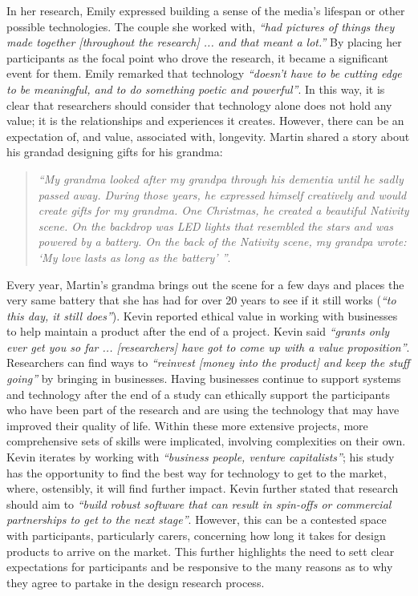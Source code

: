 In her research, Emily expressed building a sense of the media’s lifespan or other possible technologies. The couple she worked with, \textit{``had pictures of things they made together [throughout the research] ... and that meant a lot.''} By placing her participants as the focal point who drove the research, it became a significant event for them. Emily remarked that technology \textit{``doesn’t have to be cutting edge to be meaningful, and to do something poetic and powerful''}. In this way, it is clear that researchers should consider that technology alone does not hold any value; it is the relationships and experiences it creates. However, there can be an expectation of, and value, associated with, longevity. Martin shared a story about his grandad designing gifts for his grandma:
\begin{quote}
\textit{``My grandma looked after my grandpa through his dementia until he sadly passed away. During those years, he expressed himself creatively and would create gifts for my grandma. One Christmas, he created a beautiful Nativity scene. On the backdrop was LED lights that resembled the stars and was powered by a battery. On the back of the Nativity scene, my grandpa wrote: `My love lasts as long as the battery' ''}.
\end{quote}

Every year, Martin’s grandma brings out the scene for a few days and places the very same battery that she has had for over 20 years to see if it still works (\textit{``to this day, it still does''}). Kevin reported ethical value in working with businesses to help maintain a product after the end of a project. Kevin said \textit{``grants only ever get you so far ... [researchers] have got to come up with a value proposition''}. Researchers can find ways to \textit{``reinvest [money into the product] and keep the stuff going''} by bringing in businesses. Having businesses continue to support systems and technology after the end of a study can ethically support the participants who have been part of the research and are using the technology that may have improved their quality of life. Within these more extensive projects, more comprehensive sets of skills were implicated, involving complexities on their own. Kevin iterates by working with \textit{``business people, venture capitalists''}; his study has the opportunity to find the best way for technology to get to the market, where, ostensibly, it will find further impact. Kevin further stated that research should aim to \textit{``build robust software that can result in spin-offs or commercial partnerships to get to the next stage''}. However, this can be a contested space with participants, particularly carers, concerning how long it takes for design products to arrive on the market. This further highlights the need to sett clear expectations for participants and be responsive to the many reasons as to why they agree to partake in the design research process. 

